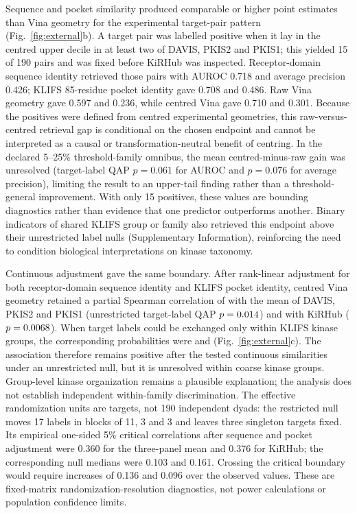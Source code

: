 \documentclass[11pt]{article}
\begin{document}
Sequence and pocket similarity produced comparable or higher point estimates than Vina
geometry for the experimental target-pair pattern (Fig.~\ref{fig:external}b). A target pair was labelled
positive when it lay in the centred upper decile in at least two of DAVIS, PKIS2 and PKIS1;
this yielded 15 of 190 pairs and was fixed before KiRHub was inspected. Receptor-domain
sequence identity retrieved those pairs with AUROC 0.718 and average precision 0.426;
KLIFS 85-residue pocket identity gave 0.708 and 0.486. Raw Vina geometry gave 0.597 and
0.236, while centred Vina gave 0.710 and 0.301. Because the positives were defined from
centred experimental geometries, this raw-versus-centred retrieval gap is conditional on the
chosen endpoint and cannot be interpreted as a causal or transformation-neutral benefit of
centring. In the declared 5--25\% threshold-family omnibus, the mean centred-minus-raw
gain was unresolved (target-label QAP $p=0.061$ for AUROC and $p=0.076$ for average
precision), limiting the result to an upper-tail finding rather than a threshold-general
improvement. With only 15 positives, these values are bounding diagnostics rather than
evidence that one predictor outperforms another.
Binary indicators of shared KLIFS group or family also retrieved this endpoint above their
unrestricted label nulls (Supplementary Information), reinforcing the need to
condition biological interpretations on kinase taxonomy.

Continuous adjustment gave the same boundary. After rank-linear adjustment for both
receptor-domain sequence identity and KLIFS pocket identity, centred Vina geometry retained
a partial Spearman correlation of \ThreePanelPartialRho{} with the mean of DAVIS, PKIS2
and PKIS1 (unrestricted target-label QAP $p=0.014{}$) and
\KiRHubPartialRho{} with KiRHub ($p=0.0068{}$). When target labels could be
exchanged only within KLIFS kinase groups, the corresponding probabilities were
\ThreePanelRestrictedP{} and \KiRHubRestrictedP{} (Fig.~\ref{fig:external}c). The
association therefore remains positive after the tested continuous similarities under an
unrestricted null, but it is unresolved within coarse kinase groups. Group-level kinase
organization remains a plausible explanation; the analysis does not establish independent
within-family discrimination. The effective randomization units are targets, not 190
independent dyads: the restricted null moves 17 labels in blocks of 11, 3 and 3 and leaves
three singleton targets fixed. Its empirical one-sided 5\% critical correlations after
sequence and pocket adjustment were 0.360 for the three-panel mean and 0.376 for KiRHub;
the corresponding null medians were 0.103 and 0.161. Crossing the critical boundary would
require increases of 0.136 and 0.096 over the observed values.
These are fixed-matrix randomization-resolution diagnostics, not power calculations or
population confidence limits.
\end{document}

